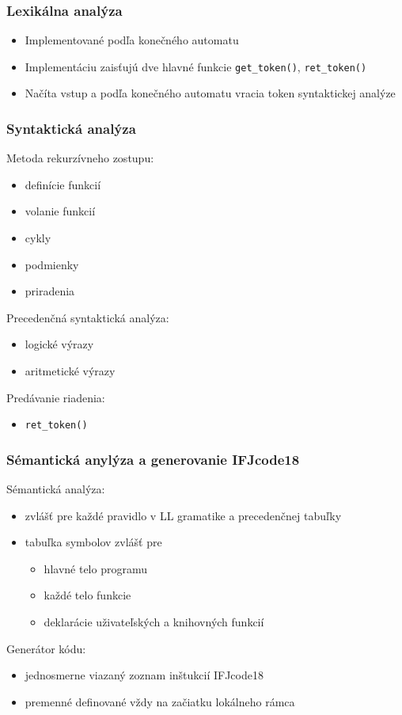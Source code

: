 \documentclass[usenames,dvipsnames]{beamer}
\begin{document}
\begin{frame}
	\frametitle{Lexikálna analýza}
	
	\begin{itemize}
	    
		\item{Implementované podľa konečného automatu}
		\item{Implementáciu zaisťujú dve hlavné funkcie \texttt{get\_token()}, \texttt{ret\_token()}}
		\item{Načíta vstup a podľa konečného automatu vracia token syntaktickej analýze}
	\end{itemize}

\end{frame}
%	
\begin{frame}
	\frametitle{Syntaktická analýza}
	Metoda rekurzívneho zostupu:
	\begin{itemize}
		\item definície funkcií
	 	\item volanie funkcií
		\item cykly
		\item podmienky
		\item priradenia
	\end{itemize}
	Precedenčná syntaktická analýza:
	\begin{itemize}
		\item logické výrazy
		\item aritmetické výrazy
	\end{itemize}
	Predávanie riadenia:
	\begin{itemize}
		\item \texttt{ret\_token()}
	\end{itemize}
\end{frame}
%
\begin{frame}
	\frametitle{Sémantická anylýza a generovanie IFJcode18}
	Sémantická analýza:
	\begin{itemize}
		\item zvlášť pre každé pravidlo v LL gramatike a precedenčnej tabuľky
		\item tabuľka symbolov zvlášť pre
		\begin{itemize}
			\item hlavné telo programu
			\item každé telo funkcie
			\item deklarácie uživateľských a knihovných funkcií
		\end{itemize}
	\end{itemize}
	Generátor kódu:
	\begin{itemize}
		\item jednosmerne viazaný zoznam inštukcií IFJcode18
		\item premenné definované vždy na začiatku lokálneho rámca
	\end{itemize}
\end{frame}
\end{document}
